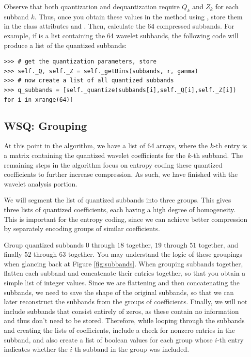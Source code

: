 \begin{problem}
Observe that both quantization and dequantization require $Q_k$ and $Z_k$ for each subband $k$.
Thus, once you obtain these values in the  method using , store them in the class attributes
 and .
Then, calculate the 64 compressed subbands.
For example, if  is a list containing the 64 wavelet subbands, the following
code will produce a list of the quantized subbands:
\begin{lstlisting}
>>> # get the quantization parameters, store
>>> self._Q, self._Z = self._getBins(subbands, r, gamma)
>>> # now create a list of all quantized subbands
>>> q_subbands = [self._quantize(subbands[i],self._Q[i],self._Z[i]) for i in xrange(64)]
\end{lstlisting}
\end{problem}
\subsection*{WSQ: Grouping}
At this point in the algorithm, we have a list of 64 arrays, where the $k$-th
entry is a matrix containing the quantized wavelet coefficients for the $k$-th subband.
The remaining steps in the algorithm focus on entropy coding these quantized
coefficients to further increase compression.
As such, we have finished with the wavelet analysis portion.

We will segment the list of quantized subbands into three groups.
This gives three lists of quantized coefficients, each having a high degree of homogeneity.
This is important for the entropy coding, since we can achieve better compression by separately encoding groups of similar coefficients.

Group quantized subbands $0$ through $18$ together, $19$ through $51$ together, and finally $52$ through $63$ together.
You may understand the logic of these groupings when glancing back at Figure \ref{fig:subbands}.
When grouping subbands together, flatten each subband and concatenate their entries together, so that you obtain a simple list of integer values.
Since we are flattening and then concatenating the subbands, we need to save the shape of the original subbands, so that we can later
reconstruct the subbands from the groups of coefficients.
Finally, we will not include subbands that consist entirely of zeros, as these contain no information and thus don't need to be stored.
Therefore, while looping through the subbands and creating the lists of coefficients, include a check for nonzero entries in the subband,
and also create a list of boolean values for each group whose $i$-th entry indicates whether the $i$-th subband in the group was included.

